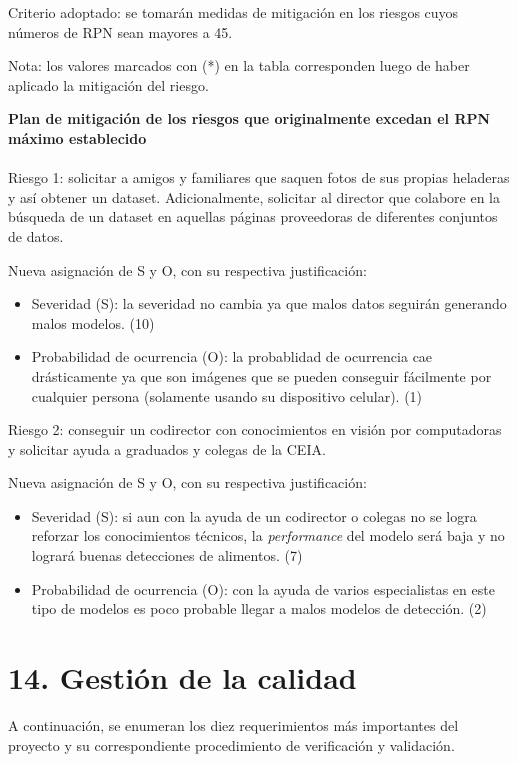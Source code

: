 \documentclass[
11pt, %
]{charter}
\begin{document}
Criterio adoptado: se tomarán medidas de mitigación en los riesgos cuyos números de RPN
sean mayores a 45.

Nota: los valores marcados con (*) en la tabla corresponden luego de haber aplicado la
mitigación del riesgo.


\textbf{Plan de mitigación de los riesgos que originalmente excedan el RPN máximo establecido}\\\\
Riesgo 1: solicitar a amigos y familiares que saquen fotos de sus propias heladeras y así obtener un dataset. Adicionalmente, solicitar al director que colabore en la búsqueda de un dataset en aquellas páginas proveedoras de diferentes conjuntos de datos.

Nueva asignación de S y O, con su respectiva justificación:
\begin{itemize}
\item Severidad (S): la severidad no cambia ya que malos datos seguirán generando malos modelos. (10)
\item Probabilidad de ocurrencia (O): la probablidad de ocurrencia cae drásticamente ya que son imágenes que se pueden conseguir fácilmente por cualquier persona (solamente usando su dispositivo celular). (1)
\end{itemize}

Riesgo 2: conseguir un codirector con conocimientos en visión por computadoras y solicitar ayuda a graduados y colegas de la CEIA.

Nueva asignación de S y O, con su respectiva justificación:
\begin{itemize}
\item Severidad (S):  si aun con la ayuda de un codirector o colegas no se logra reforzar los conocimientos técnicos, la \textit{performance} del modelo será baja y no logrará buenas detecciones de alimentos. (7)
\item Probabilidad de ocurrencia (O): con la ayuda de varios especialistas en este tipo de modelos es poco probable llegar a malos modelos de detección. (2)
\end{itemize}


\section{14. Gestión de la calidad}
\label{sec:calidad}


A continuación, se enumeran los diez requerimientos más importantes del proyecto y su correspondiente procedimiento de verificación y validación. 
\end{document}
